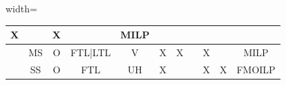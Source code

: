 \begin{table}[!ht]
\begin{adjustbox}{width=\textwidth}
\begin{tabular}{|c|c|c|c|c|c|c|l|c|c|c|}
      X                                                                                  &                &
      X                                                                                  &
                                                                                         &
      MILP                                                                                                                                              \\ \hline
      \autocite{Schoneberg2013ANetworks}                                                 &
      MS                                                                                 &
      O                                                                                  &
      FTL|LTL                                                                            &
      V                                                                                  &
      X                                                                                  &
      X                                                                                  &                &
      X                                                                                  &
                                                                                         &
      MILP                                                                                                                                              \\ \hline
      \autocite{Diaz-Madronero2014AChain}
                                                                                         &
      SS                                                                                 &
      O                                                                                  &
      FTL                                                                                &
      UH                                                                                 &
      X                                                                                  &
                                                                                         &                &
      X                                                                                  &
      X                                                                                  &
      FMOILP                                                                                                                                            \\ \hline

\end{tabular}
\end{adjustbox}
\end{table}
